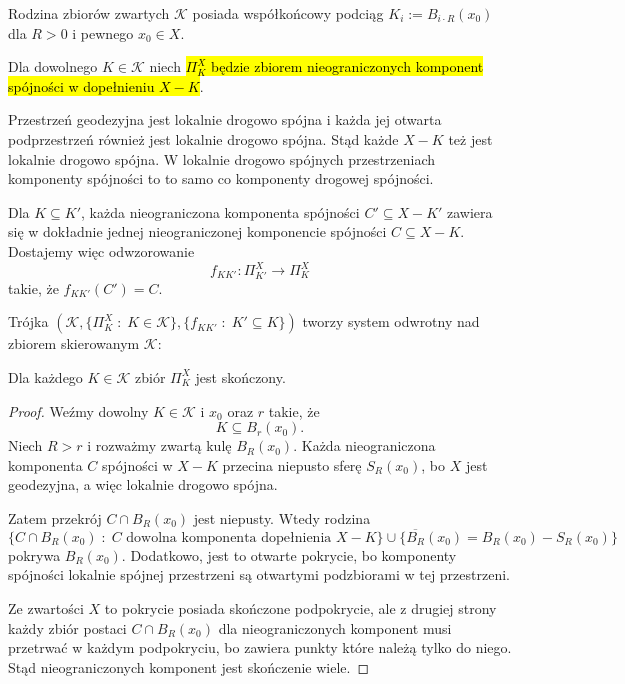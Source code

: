 \begin{example}
Rodzina zbiorów zwartych $\mathcal{K}$ posiada współkońcowy podciąg $K_i:=B_{i\cdot R}(x_0)$ dla $R>0$ i pewnego $x_0\in X$.
  \end{example}
    
Dla dowolnego $K\in\mathcal{K}$ niech \hl{$\Pi_K^X$ będzie zbiorem nieograniczonych komponent spójności w dopełnieniu $X-K$}.

Przestrzeń geodezyjna jest lokalnie drogowo spójna i każda jej otwarta podprzestrzeń również jest lokalnie drogowo spójna. Stąd każde $X-K$ też jest lokalnie drogowo spójna. W lokalnie drogowo spójnych przestrzeniach komponenty spójności to to samo co komponenty drogowej spójności.\medskip

Dla $K\subseteq K'$, każda nieograniczona komponenta spójności $C'\subseteq X-K'$ zawiera się w dokładnie jednej nieograniczonej komponencie spójności $C\subseteq X-K$. Dostajemy więc odwzorowanie 
$$f_{KK'}:\Pi_{K'}^X\to \Pi_K^X$$
takie, że $f_{KK'}(C')=C$. 

Trójka $(\mathcal{K}, \{\Pi_K^X\;:\;K\in\mathcal{K}\},\{f_{KK'}\;:\;K'\subseteq K\})$ tworzy system odwrotny nad zbiorem skierowanym $\mathcal{K}$:
\begin{center}
\end{center}

\begin{fact}{}{}
  Dla każdego $K\in\mathcal{K}$ zbiór $\Pi_K^X$ jest skończony.
\end{fact}

\begin{proof}
  Weźmy dowolny $K\in\mathcal{K}$ i $x_0$ oraz $r$ takie, że 
  $$K\subseteq B_r(x_0).$$ 
  Niech $R>r$ i rozważmy zwartą kulę $B_R(x_0)$. Każda nieograniczona komponenta $C$ spójności w $X-K$ przecina niepusto sferę $S_R(x_0)$, bo $X$ jest geodezyjna, a więc lokalnie drogowo spójna.

  Zatem przekrój $C\cap B_R(x_0)$ jest niepusty. Wtedy rodzina 
  $$\{C\cap B_R(x_0)\;:\;C\text{ dowolna komponenta dopełnienia }X-K\}\cup \{\overline{B_R}(x_0)=B_R(x_0)-S_R(x_0)\}$$
  pokrywa $B_R(x_0)$. Dodatkowo, jest to otwarte pokrycie, bo komponenty spójności lokalnie spójnej przestrzeni są otwartymi podzbiorami w tej przestrzeni. 

  Ze zwartości $X$ to pokrycie posiada skończone podpokrycie, ale z drugiej strony każdy zbiór postaci $C\cap B_R(x_0)$ dla nieograniczonych komponent musi przetrwać w każdym podpokryciu, bo zawiera punkty które należą tylko do niego. Stąd nieograniczonych komponent jest skończenie wiele.
\end{proof}

